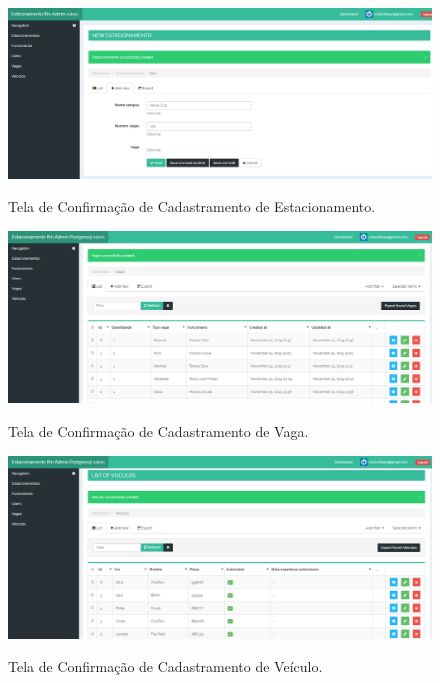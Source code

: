 \begin{figure}[h]
	\caption{Tela de Confirmação de Cadastramento de Estacionamento.}
	
	\centering %
	\includegraphics[scale=0.45]{Figs/cadastroEstacionamentoCreated.png} %
	\label{figura:cadastroEstacionamentoCreated}
\end{figure}



 
 \begin{figure}[h]
 	\caption{Tela de Confirmação de Cadastramento de Vaga.}
 	
 	\centering %
 	\includegraphics[scale=0.45]{Figs/vagaSuccessfullyCreated.png} %
 	\label{figura:vagaSuccessfullyCreated}
 \end{figure}

\begin{figure}[h]
	\caption{Tela de Confirmação de Cadastramento de Veículo.}
	
	\centering %
	\includegraphics[scale=0.45]{Figs/cadastroVeiculoCreated.png} %
	\label{figura:cadastroVeiculoCreated}
\end{figure}
